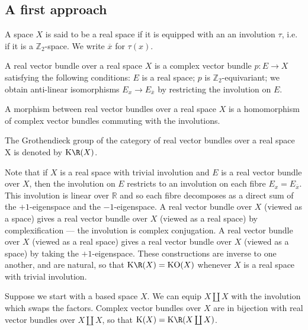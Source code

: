 \documentclass[11pt]{article}
\begin{document}
\begin{FirstWeek}
\subsection*{A first approach}
\begin{defn*} A space $X$ is said to be a real space if it is equipped with an an involution $\tau$, i.e. if it is a $\mathbb{Z}_2$-space. We write $\overline{x}$ for $\tau(x)$.
\end{defn*}
\begin{defn*} A real vector bundle over a real space $X$ is a complex vector bundle $p:E\to X$ satisfying the following conditions: $E$ is a real space; $p$ is $\mathbb{Z}_2$-equivariant; we obtain anti-linear isomorphisms $E_x \to E_{\overline{x}}$ by restricting the involution on $E$.
\end{defn*}
\begin{defn*} 
A morphism between real vector bundles over a real space $X$ is a homomorphism of complex vector bundles commuting with the involutions.
\end{defn*}
\begin{defn*}
The Grothendieck group of the category of real vector bundles over a real space X is denoted by $\KR(X)$.
\end{defn*}
Note that if $X$ is a real space with trivial involution and $E$ is a real vector bundle over $X$, then the involution on $E$ restricts to an involution on each fibre $E_{x}=E_{\overline{x}}$. This involution is linear over $\mathbb{R}$ and so each fibre decomposes as a direct sum of the $+1$-eigenspace and the $-1$-eigenspace. A real vector bundle over $X$ (viewed as a space) gives a real vector bundle over $X$ (viewed as a real space) by complexification --- the involution is complex conjugation. A real vector bundle over $X$ (viewed as a real space) gives a real vector bundle over $X$ (viewed as a space) by taking the $+1$-eigenspace. These constructions are inverse to one another, and are natural, so that $\KR(X)=\KO(X)$ whenever $X$ is a real space with trivial involution.

Suppose we start with a based space $X$. We can equip $X\coprod X$  with the involution which swaps the factors. Complex vector bundles over $X$ are in bijection with real vector bundles over $X\coprod X$, so that $\K(X)=\KR(X\coprod X)$.

\end{FirstWeek}
\end{document}
